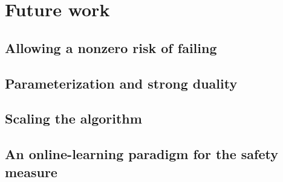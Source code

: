 \chapter{Future work}


\section{Allowing a nonzero risk of failing} \label{sec:future nonzero}

\section{Parameterization and strong duality}

\section{Scaling the algorithm}

\section{An online-learning paradigm for the safety measure}